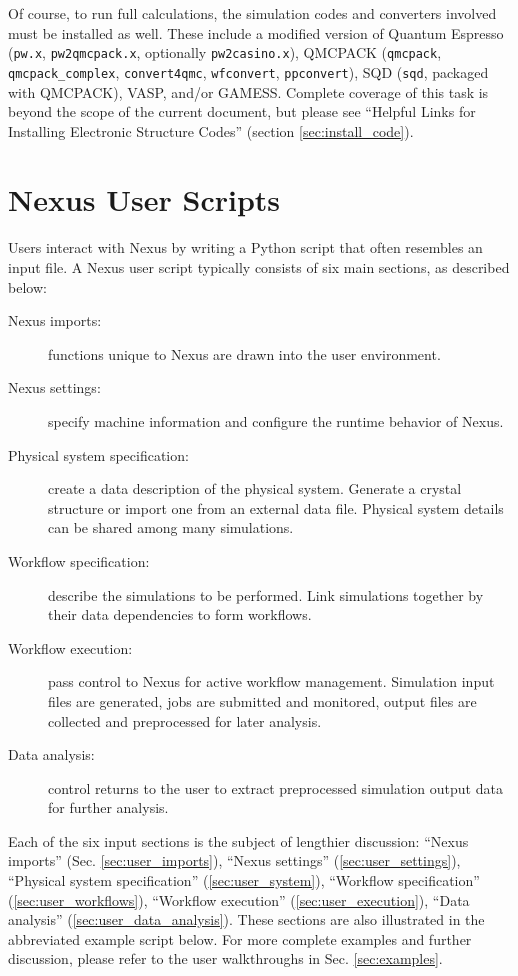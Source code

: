 \documentclass[oneside,11pt]{memoir}
\numberwithin{equation}{section}
\begin{document}
Of course, to run full calculations, the simulation codes and converters 
involved must be installed as well.  These include a modified version of 
Quantum Espresso (\texttt{pw.x}, \texttt{pw2qmcpack.x}, optionally 
\texttt{pw2casino.x}), QMCPACK (\texttt{qmcpack}, \texttt{qmcpack\_complex}, \texttt{convert4qmc}, \texttt{wfconvert}, \texttt{ppconvert}), 
SQD (\texttt{sqd}, packaged with QMCPACK), VASP, and/or GAMESS.  
Complete coverage of this task is beyond the scope of the current document, but 
please see ``Helpful Links for Installing Electronic Structure Codes'' 
(section \ref{sec:install_code}).






\pagebreak
\chapter{Nexus User Scripts} \label{sec:user_scripts}

Users interact with Nexus by writing a Python script that often resembles an input file.  A Nexus user script typically consists of six main sections, as described below:

\begin{description}
  \item[Nexus imports:] functions unique to Nexus are drawn into the user environment.
  \item[Nexus settings:] specify machine information and configure the runtime behavior of Nexus.
  \item[Physical system specification:]  create a data description of the physical system.  Generate a crystal structure or import one from an external data file.  Physical system details can be shared among many simulations.
  \item[Workflow specification:] describe the simulations to be performed.  Link simulations together by their data dependencies to form workflows.
  \item[Workflow execution:] pass control to Nexus for active workflow management.  Simulation input files are generated, jobs are submitted and monitored, output files are collected and preprocessed for later analysis.
  \item[Data analysis:] control returns to the user to extract preprocessed simulation output data for further analysis. 
\end{description}


Each of the six input sections is the subject of lengthier discussion: ``Nexus imports'' (Sec. \ref{sec:user_imports}), ``Nexus settings'' (\ref{sec:user_settings}), ``Physical system specification'' (\ref{sec:user_system}),  ``Workflow specification'' (\ref{sec:user_workflows}), ``Workflow execution'' (\ref{sec:user_execution}), ``Data analysis'' (\ref{sec:user_data_analysis}).  These sections are also illustrated in the abbreviated example script below.  For more complete examples and further discussion, please refer to the user walkthroughs in Sec. \ref{sec:examples}.
\end{document}
